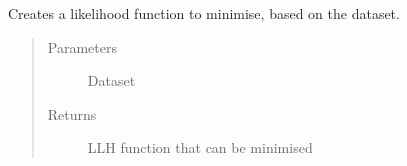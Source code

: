 \documentclass[letterpaper,10pt,english]{sphinxmanual}
\begin{document}
\begin{fulllineitems}
\begin{fulllineitems}
\begin{quote}
\begin{description}
\end{description}\end{quote}

\end{fulllineitems}


\begin{fulllineitems}
\label{\detokenize{index:flarestack.core.llh.LLH.create_kwargs}}
\end{fulllineitems}


\begin{fulllineitems}
\label{\detokenize{index:flarestack.core.llh.LLH.create_llh_function}}
Creates a likelihood function to minimise, based on the dataset.
\begin{quote}\begin{description}
\item[{Parameters}] \leavevmode
{} \textendash{} Dataset

\item[{Returns}] \leavevmode
LLH function that can be minimised

\end{description}\end{quote}

\end{fulllineitems}


\begin{fulllineitems}
\label{\detokenize{index:flarestack.core.llh.LLH.get_injected_parameters}}
\end{fulllineitems}


\end{fulllineitems}
\end{document}
